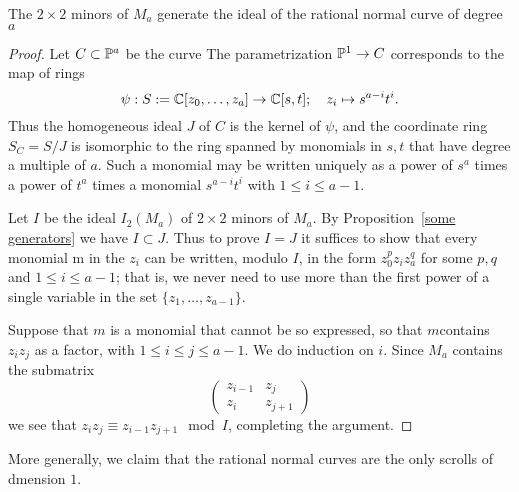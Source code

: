 \begin{proposition}\label{RNC ideal}
 The $2\times 2$ minors of $M_a$ generate the ideal of the rational normal curve of degree $a$
\end{proposition}

\begin{proof} Let $C\subset {\mathbb P}^a$ be the curve
The parametrization ${\mathbb P}^1 \to C$  corresponds to the map of rings
$$
\psi: S:= {\mathbb C}[z_0,\dots,z_a] \to {\mathbb C}[s,t]; \quad z_i \mapsto s^{a-i}t^i.
$$
Thus the homogeneous ideal $J$ of $C$ is the kernel of $\psi$, and
the coordinate ring $S_C = S/J$ is isomorphic to the ring spanned by
monomials in $s,t$ that have degree a multiple of $a$. Such
a monomial may be written uniquely as a power of
$s^a$
times a power of $t^a$ times a monomial $s^{a-i}t^i$ with $1\leq i\leq a-1$.

Let $I$ be the ideal $I_2(M_a)$ of $2\times 2$ minors of $M_a$. By Proposition~\ref{some generators} we have $I\subset J$. Thus to prove $I=J$ it suffices to show that
every monomial m in the $z_i$ can be written, modulo $I$, in the form
$z_0^pz_iz_a^q$ for some $p,q$ and $1\leq i\leq a-1$; that is, we never need to
use more than the first power of a single variable in the set $\{z_1,\dots, z_{a-1}\}$.

Suppose that $m$ is a monomial that cannot be so expressed, so that $m$contains $z_iz_j$ as a factor, with $1\leq i\leq j\leq a-1$. We do induction on $i$. Since
$M_a$ contains the submatrix
$$
\begin{pmatrix}
 z_{i-1} & z_{j}\\
 z_i & z_{j+1}
\end{pmatrix}
$$
we see that $z_iz_j \equiv z_{i-1}z_{j+1} \mod I$, completing the argument.
\end{proof}

More generally, we claim that the rational normal curves are the only 
scrolls of dmension $1$.

